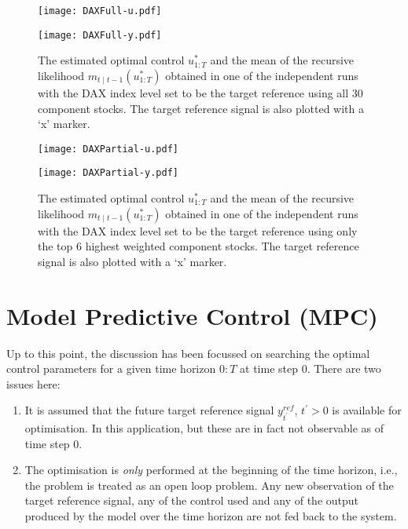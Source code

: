 \begin{figure}[htbp]
\centering
    \begin{minipage}{0.5\textwidth}
        \centering
        \texttt{[image: DAXFull-u.pdf]}
    \end{minipage}%
    \begin{minipage}{0.5\textwidth}
        \centering
        \texttt{[image: DAXFull-y.pdf]}
    \end{minipage}
\caption{The estimated optimal control $u^*_{1:T}$ and the mean of the recursive likelihood $m_{t \mid t-1}(u^*_{1:T})$ obtained in one of the independent runs with the DAX index level set to be the target reference using all $30$ component stocks.  The target reference signal is also plotted with a `x' marker.}
\label{fig:dax}
\end{figure}

\begin{figure}[htbp]
\centering
    \begin{minipage}{0.5\textwidth}
        \centering
        \texttt{[image: DAXPartial-u.pdf]}
    \end{minipage}%
    \begin{minipage}{0.5\textwidth}
        \centering
        \texttt{[image: DAXPartial-y.pdf]}
    \end{minipage}
\caption{The estimated optimal control $u^*_{1:T}$ and the mean of the recursive likelihood $m_{t \mid t-1}(u^*_{1:T})$ obtained in one of the independent runs with the DAX index level set to be the target reference using only the top $6$ highest weighted component stocks.  The target reference signal is also plotted with a `x' marker.}
\label{fig:daxpartial}
\end{figure}

\section{Model Predictive Control (MPC)}
Up to this point, the discussion has been focussed on searching the optimal control parameters for a given time horizon $0:T$ at time step $0$. There are two issues here:
\begin{enumerate}
\item It is assumed that the future target reference signal $y^{ref}_{t^\prime}$, $t^\prime > 0$ is available for optimisation. In this application, but these are in fact not observable as of time step $0$.
\item The optimisation is \emph{only} performed at the beginning of the time horizon, i.e., the problem is treated as an open loop problem. Any new observation of the target reference signal, any of the control used and any of the output produced by the model over the time horizon are not fed back to the system.
\end{enumerate}

